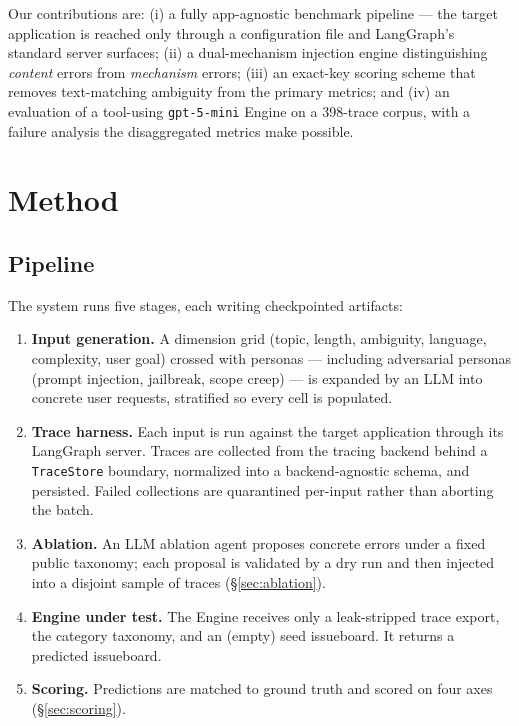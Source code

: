 \documentclass[11pt]{article}
\newcommand{\code}[1]{\texttt{#1}}
\begin{document}
Our contributions are: (i) a fully app-agnostic benchmark pipeline --- the target application is reached only through a configuration file and LangGraph's standard server surfaces; (ii) a dual-mechanism injection engine distinguishing \emph{content} errors from \emph{mechanism} errors; (iii) an exact-key scoring scheme that removes text-matching ambiguity from the primary metrics; and (iv) an evaluation of a tool-using \code{gpt-5-mini} Engine on a 398-trace corpus, with a failure analysis the disaggregated metrics make possible.

\section{Method}

\subsection{Pipeline}

The system runs five stages, each writing checkpointed artifacts:

\begin{enumerate}
  \item \textbf{Input generation.} A dimension grid (topic, length, ambiguity, language, complexity, user goal) crossed with personas --- including adversarial personas (prompt injection, jailbreak, scope creep) --- is expanded by an LLM into concrete user requests, stratified so every cell is populated.
  \item \textbf{Trace harness.} Each input is run against the target application through its LangGraph server. Traces are collected from the tracing backend behind a \code{TraceStore} boundary, normalized into a backend-agnostic schema, and persisted. Failed collections are quarantined per-input rather than aborting the batch.
  \item \textbf{Ablation.} An LLM ablation agent proposes concrete errors under a fixed public taxonomy; each proposal is validated by a dry run and then injected into a disjoint sample of traces (\S\ref{sec:ablation}).
  \item \textbf{Engine under test.} The Engine receives only a leak-stripped trace export, the category taxonomy, and an (empty) seed issueboard. It returns a predicted issueboard.
  \item \textbf{Scoring.} Predictions are matched to ground truth and scored on four axes (\S\ref{sec:scoring}).
\end{enumerate}
\end{document}
